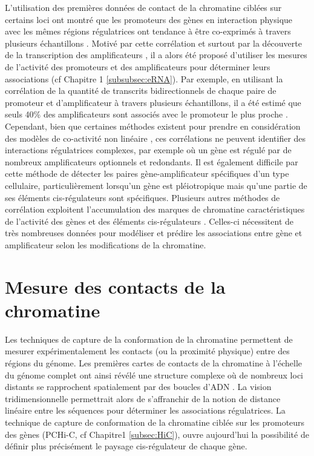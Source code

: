 L’utilisation des premières données de contact de la chromatine ciblées sur certains loci ont montré que les promoteurs des gènes en interaction physique avec les mêmes régions régulatrices ont tendance à être co-exprimés à travers plusieurs échantillons \citep{dekker_capturing_2002, chepelev_characterization_2012, li_extensive_2012}. Motivé par cette corrélation et surtout par la découverte de la transcription des amplificateurs \citep{kim_widespread_2010}, il a alors été proposé d’utiliser les mesures de l’activité des promoteurs et des amplificateurs pour déterminer leurs associations (cf Chapitre 1 \ref{subsubsec:eRNA}). Par exemple, en utilisant la corrélation de la quantité de transcrits bidirectionnels de chaque paire de promoteur et d’amplificateur à travers plusieurs échantillons, il a été estimé que seuls 40\% des amplificateurs sont associés avec le promoteur le plus proche \citep{andersson_atlas_2014}. Cependant, bien que certaines méthodes existent pour prendre en considération des modèles de co-activité non linéaire \citep{hait_focs_2018}, ces corrélations ne peuvent identifier des interactions régulatrices complexes, par exemple où un gène est régulé par de nombreux amplificateurs optionnels et redondants. Il est également difficile par cette méthode de détecter les paires gène-amplificateur spécifiques d’un type cellulaire, particulièrement lorsqu’un gène est pléiotropique mais qu’une partie de ses éléments \gls{cis}-régulateurs sont spécifiques. Plusieurs autres méthodes de corrélation exploitent l’accumulation des marques de chromatine caractéristiques de l’activité des gènes et des éléments \gls{cis}-régulateurs \citep{whalen_enhancerpromoter_2016, cao_reconstruction_2017}. Celles-ci nécessitent de très nombreuses données pour modéliser et prédire les associations entre gène et amplificateur selon les modifications de la chromatine.  

\section{Mesure des contacts de la chromatine}
\label{sec:mesure-contact}

Les techniques de capture de la conformation de la chromatine permettent de mesurer expérimentalement les contacts (ou la proximité physique) entre des régions du génome. Les premières cartes de contacts de la chromatine à l’échelle du génome complet ont ainsi révélé une structure complexe où de nombreux loci distants se rapprochent spatialement par des boucles d’ADN \citep{schoenfelder_pluripotent_2015, mifsud_mapping_2015}. La vision tridimensionnelle permettrait alors de s’affranchir de la notion de distance linéaire entre les séquences pour déterminer les associations régulatrices. La technique de capture de conformation de la chromatine ciblée sur les promoteurs des gènes (\gls{PCHi-C}, cf Chapitre1 \ref{subsec:HiC}), ouvre aujourd’hui la possibilité de définir plus précisément le paysage \gls{cis}-régulateur de chaque gène. \\


